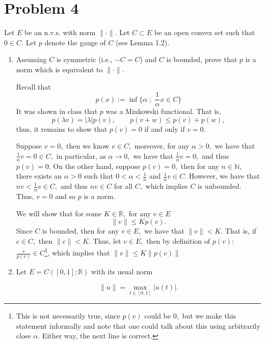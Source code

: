 \documentclass[11pt]{article}
\newcommand{\bbN}{\mathbb{N}}
\newcommand{\bbR}{\mathbb{R}}
\begin{document}
\section*{Problem 4}
\begin{problem}
    
Let \( E \) be an n.v.s. with norm \( \| \cdot \| \). Let \( C \subset E \) be an open convex set such that \( 0 \in C \). Let \( p \) denote the gauge of \( C \) (see Lemma 1.2).

\begin{enumerate}
    \item Assuming \( C \) is symmetric (i.e., \( -C = C \)) and \( C \) is bounded, prove that \( p \) is a norm which is equivalent to \( \| \cdot \| \).
    \begin{solution}
    Recall that 
    \[p(x):= \inf\{\alpha \; ; \; \frac{1}{\alpha}x \in C\}\]
        It was shown in class that $p$ was a Minkowski functional. That is, 
        \[p(\lambda v) = |\lambda|p(v), \qquad p(v + w) \leq p(v) + p(w),\] thus, it remains to show that $p(v) = 0$ if and only if $v = 0.$ 
        
        Suppose $v = 0,$ then we know $v\in C,$ moreover, for any $\alpha >0,$ we have that $\frac{1}{\alpha}v = 0 \in C,$ in particular, as $\alpha \to 0,$ we have that $\frac{1}{\alpha}v = 0,$ and thus $p(v) = 0.$ On the other hand, suppose $p(v) = 0,$ then for any $n \in \bbN,$ there exists an $\alpha>0$ such that $0 < \alpha < \frac{1}{n}$ and $\frac{1}{\alpha}v \in C.$ However, we have that $nv < \frac{1}{\alpha}v \in C,$ and thus $nv \in C$ for all $C,$ which implies $C$ is unbounded. Thus, $v = 0$ and so $p$ is a norm.

        We will show that for some $K \in \bbR,$ for any $v\in E$
        \[\|v\| \leq Kp(v).\] Since $C$ is bounded, then for any $v\in E,$ we have that $\|v\|< K.$ That is, if $c \in C,$ then $\|c\| < K.$ Thus, let $v\in E,$ then by definition of $p(v):$ 
        $\frac{v}{p(v)} \in C$\footnote{This is not necessarily true, since $p(v)$ could be $0,$ but we make this statement informally and note that one could talk about this using arbitrarily close $\alpha.$ Either way, the next line is correct.}, which implies that $\|v\| \leq K\|p(v)\|$

        
    \end{solution}

\item Let \( E = C([0, 1]; \mathbb{R}) \) with its usual norm


\[
\|u\| = \max_{t \in [0,1]} |u(t)|.
\]




\end{enumerate}
\end{problem}
\end{document}
